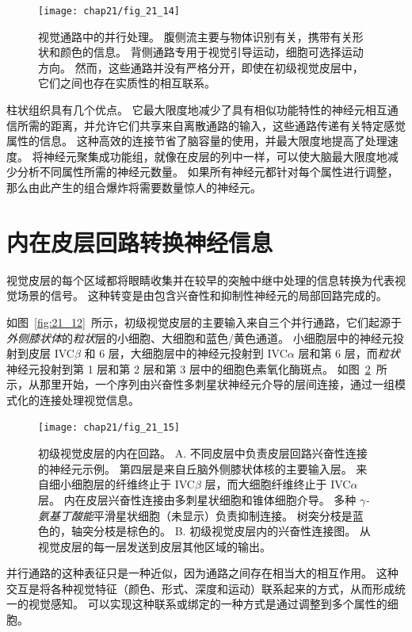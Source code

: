 \begin{figure}[htbp]
	\centering
	\texttt{[image: chap21/fig\_21\_14]}
	\caption{视觉通路中的并行处理。
		腹侧流主要与物体识别有关，携带有关形状和颜色的信息。
		背侧通路专用于视觉引导运动，细胞可选择运动方向。
		然而，这些通路并没有严格分开，即使在初级视觉皮层中，它们之间也存在实质性的相互联系。}
	\label{fig:21_14}
\end{figure}


柱状组织具有几个优点。
它最大限度地减少了具有相似功能特性的神经元相互通信所需的距离，并允许它们共享来自离散通路的输入，这些通路传递有关特定感觉属性的信息。
这种高效的连接节省了脑容量的使用，并最大限度地提高了处理速度。
将神经元聚集成功能组，就像在皮层的列中一样，可以使大脑最大限度地减少分析不同属性所需的神经元数量。
如果所有神经元都针对每个属性进行调整，那么由此产生的组合爆炸将需要数量惊人的神经元。



\section{内在皮层回路转换神经信息}

视觉皮层的每个区域都将眼睛收集并在较早的突触中继中处理的信息转换为代表视觉场景的信号。
这种转变是由包含兴奋性和抑制性神经元的局部回路完成的。


如图~\ref{fig:21_12}~所示，初级视觉皮层的主要输入来自三个并行通路，它们起源于\textit{外侧膝状体}的\textit{粒状}层的小细胞、大细胞和蓝色/黄色通道。
小细胞层中的神经元投射到皮层 IVC$\beta$ 和 6 层，大细胞层中的神经元投射到 IVC$\alpha$ 层和第 6 层，而\textit{粒状}神经元投射到第 1 层和第 2 层和第 3 层中的细胞色素氧化酶斑点。
如图~\ref{fig:21_15}~所示，从那里开始，一个序列由兴奋性多刺星状神经元介导的层间连接，通过一组模式化的连接处理视觉信息。


\begin{figure}[htbp]
	\centering
	\texttt{[image: chap21/fig\_21\_15]}
	\caption{初级视觉皮层的内在回路。
		A. 不同皮层中负责皮层回路兴奋性连接的神经元示例。 
		第四层是来自丘脑外侧膝状体核的主要输入层。 
		来自细小细胞层的纤维终止于 IVC$\beta$ 层，而大细胞纤维终止于 IVC$\alpha$ 层。 
		内在皮层兴奋性连接由多刺星状细胞和锥体细胞介导。 
		多种 \textit{$\gamma$-氨基丁酸能}平滑星状细胞（未显示）负责抑制连接。 
		树突分枝是蓝色的，轴突分枝是棕色的\cite{blasdel1983termination}。
		B. 初级视觉皮层内的兴奋性连接图。
		从视觉皮层的每一层发送到皮层其他区域的输出。}
	\label{fig:21_15}
\end{figure}


并行通路的这种表征只是一种近似，因为通路之间存在相当大的相互作用。
这种交互是将各种视觉特征（颜色、形式、深度和运动）联系起来的方式，从而形成统一的视觉感知。
可以实现这种联系或绑定的一种方式是通过调整到多个属性的细胞。


